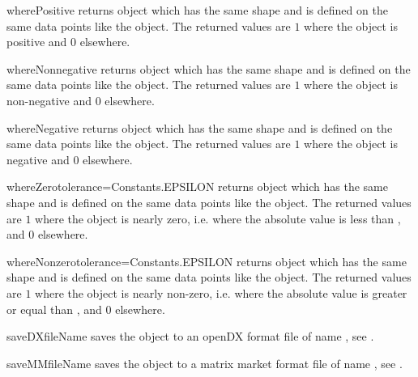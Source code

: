 \begin{methoddesc}[Data]{wherePositive}{}
returns \Data object which has the same shape and is defined on
the same data points like the object. The returned values are $1$
where the object is positive and $0$ elsewhere.
\end{methoddesc}

\begin{methoddesc}[Data]{whereNonnegative}{}
returns \Data object which has the same shape and is defined on
the same data points like the object. The returned values are $1$
where the object is non-negative and $0$ elsewhere.
\end{methoddesc}

\begin{methoddesc}[Data]{whereNegative}{}
returns \Data object which has the same shape and is defined on
the same data points like the object. The returned values are $1$
where the object is negative and $0$ elsewhere.
\end{methoddesc}

\begin{methoddesc}[Data]{whereZero}{tolerance=Constants.EPSILON}
returns \Data object which has the same shape and is defined on
the same data points like the object. The returned values are $1$
where the object is nearly zero, i.e. where the absolute value is less
than , and $0$ elsewhere.
\end{methoddesc}

\begin{methoddesc}[Data]{whereNonzero}{tolerance=Constants.EPSILON}
returns \Data object which has the same shape and is defined on
the same data points like the object. The returned values are $1$
where the object is nearly non-zero, i.e. where the absolute value is
greater or equal than , and $0$ elsewhere.
\end{methoddesc}

\begin{methoddesc}[Data]{saveDX}{fileName}
saves the object to an openDX format file of name , see
.  
\end{methoddesc}

\begin{methoddesc}[Data]{saveMM}{fileName}
saves the object to a matrix market format file of name
, see
.
\end{methoddesc}

